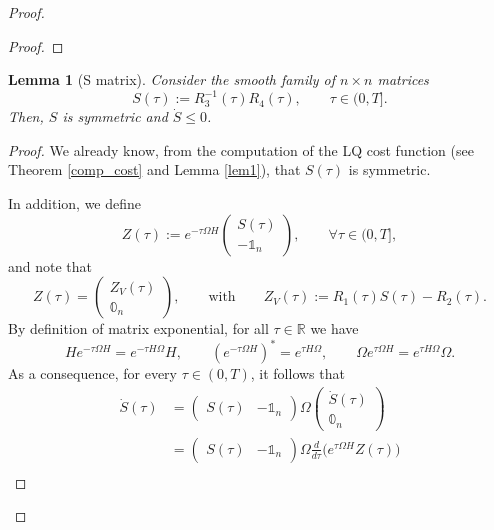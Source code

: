 \documentclass[reqno]{amsart}
\theoremstyle{plain}
\newtheorem{lem}[thm]{Lemma}
\theoremstyle{definition}
\theoremstyle{remark}
\newcommand{\R}{\mathbb{R}}
\begin{document}
\begin{proof}
\begin{proof}
		\end{proof}
		\begin{lem}[S matrix]\label{S_matrix}
			Consider the smooth family of $n\times n$ matrices 
			\begin{equation}
				S(\tau):=R_3^{-1}(\tau)R_4(\tau),\qquad \tau\in(0,T].
			\end{equation}
			Then, $S$ is symmetric and $\dot{S}\leq 0$.
		\end{lem}
		\begin{proof}
		We already know, from the computation of the LQ cost function (see Theorem \ref{comp_cost} and Lemma \ref{lem1}), that $S(\tau)$ is symmetric.

		In addition, we define
		\begin{equation}
			Z(\tau):=e^{-\tau\Omega H}\begin{pmatrix}
			S(\tau)\\
			-\mathbb{1}_n
			\end{pmatrix},\qquad\forall \tau\in(0,T],
		\end{equation}
        and note that 
        \begin{equation}
            Z(\tau)=\begin{pmatrix}
			Z_V(\tau)\\ 
			\mathbb{0}_n
			\end{pmatrix},\qquad \text{with} \qquad Z_V(\tau):=R_1(\tau)S(\tau)-R_2(\tau).
        \end{equation}
		By definition of matrix exponential, for all $\tau\in \R$ we have
		\begin{equation}
			H e^{-\tau\Omega H}=e^{-\tau H\Omega}H,\qquad \left(e^{-\tau\Omega H}\right)^*=e^{\tau H\Omega},\qquad \Omega e^{\tau\Omega H}=e^{\tau H\Omega}\Omega.
		\end{equation}
		As a consequence, for every $\tau \in(0,T)$, it follows that
		\begin{align}
			\dot{S}(\tau)&=\begin{pmatrix}
				S(\tau) & -\mathbb{1}_n
			\end{pmatrix}\Omega\begin{pmatrix}
			\dot{S}(\tau)\\
			\mathbb{0}_n
			\end{pmatrix}\\
			&=\begin{pmatrix}
				S(\tau) & -\mathbb{1}_n
			\end{pmatrix}\Omega\frac{d}{d\tau}\bigg(e^{\tau\Omega H}Z(\tau)\bigg)\\

\end{align}
\end{proof}
\end{proof}
\end{document}
